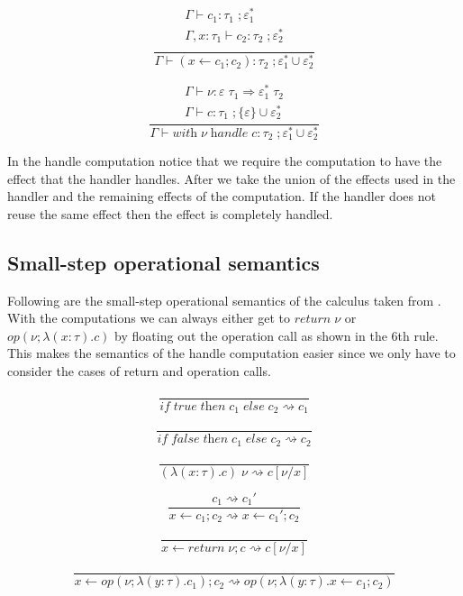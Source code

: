 \documentclass[12pt]{article}
\newcommand\eff[0]{\varepsilon}
\newcommand\effs[0]{\eff^*}
\newcommand\eop[0]{\textit{op}}
\newcommand\type[0]{\tau}
\newcommand\thandler[4]{#1 \; #2 \Rightarrow #3 \; #4}
\newcommand\val[0]{\nu}
\newcommand\vtrue[0]{\textit{true}}
\newcommand\vfalse[0]{\textit{false}}
\newcommand\vabs[3]{\lambda(#1 : #2) . #3}
\newcommand\comp[0]{c}
\newcommand\cif[3]{\textit{if} \; #1 \; \textit{then} \; #2 \; \textit{else} \; #3}
\newcommand\creturn[1]{\textit{return} \; #1}
\newcommand\capp[2]{#1 \; #2}
\newcommand\cop[5]{#1(#2 ; \lambda (#3 : #4) . #5)}
\newcommand\cdo[3]{#1 \leftarrow #2 ; #3}
\newcommand\chandle[2]{\textit{with} \; #1 \; \textit{handle} \; #2}
\begin{document}
\begin{minipage}{0.5\textwidth}
\[\frac{
	\begin{array}{l}
	\Gamma \vdash \comp_1 : \type_1 \; ; \effs_1 \\
	\Gamma , x : \type_1 \vdash \comp_2 : \type_2 \; ; \effs_2 \\
	\end{array}
}{
	\Gamma \vdash (\cdo{x}{\comp_1}{\comp_2}) : \type_2 \; ; \effs_1 \cup \effs_2
}\]
\end{minipage}
\begin{minipage}{0.5\textwidth}
\[\frac{
	\begin{array}{l}
	\Gamma \vdash \val : \thandler{\eff}{\type_1}{\effs_1}{\type_2} \\
	\Gamma \vdash \comp : \type_1 \; ; \{ \eff \} \cup \effs_2
	\end{array}
}{
	\Gamma \vdash \chandle{\val}{\comp} : \type_2 \; ; \effs_1 \cup \effs_2
}\]
\end{minipage}
In the handle computation notice that we require the computation to have the effect that the handler handles. After we take the union of the effects used in the handler and the remaining effects of the computation. If the handler does not reuse the same effect then the effect is completely handled.
\newpage
\subsection{Small-step operational semantics}

Following are the small-step operational semantics of the calculus taken from \cite{pretnar}.
With the computations we can always either get to $\creturn{\val}$ or $\cop{\eop}{\val}{x}{\type}{\comp}$ by floating out the operation call as shown in the 6th rule.
This makes the semantics of the handle computation easier since we only have to consider the cases of return and operation calls.

\begin{minipage}{0.5\textwidth}
\[\frac{
}{
	\cif{\vtrue}{\comp_1}{\comp_2} \rightsquigarrow \comp_1
}\]
\end{minipage}
\begin{minipage}{0.5\textwidth}
\[\frac{
}{
	\cif{\vfalse}{\comp_1}{\comp_2} \rightsquigarrow \comp_2
}\]
\end{minipage}
\begin{minipage}{0.5\textwidth}
\[\frac{
}{
	\capp{(\vabs{x}{\type}{\comp})}{\val} \rightsquigarrow \comp[\val / x]
}\]
\end{minipage}
\begin{minipage}{0.5\textwidth}
\[\frac{
	\comp_1 \rightsquigarrow \comp_1'
}{
	\cdo{x}{\comp_1}{\comp_2} \rightsquigarrow \cdo{x}{\comp_1'}{\comp_2}
}\]
\end{minipage}
\begin{minipage}{0.5\textwidth}
\[\frac{
}{
	\cdo{x}{\creturn{\val}}{\comp} \rightsquigarrow \comp[\val / x]
}\]
\end{minipage}
\begin{minipage}{0.5\textwidth}
\[\frac{
}{
	\cdo{x}{\cop{\eop}{\val}{y}{\type}{\comp_1}}{\comp_2} \rightsquigarrow \cop{\eop}{\val}{y}{\type}{\cdo{x}{\comp_1}{\comp_2}}
}\]
\end{minipage}
\end{document}
